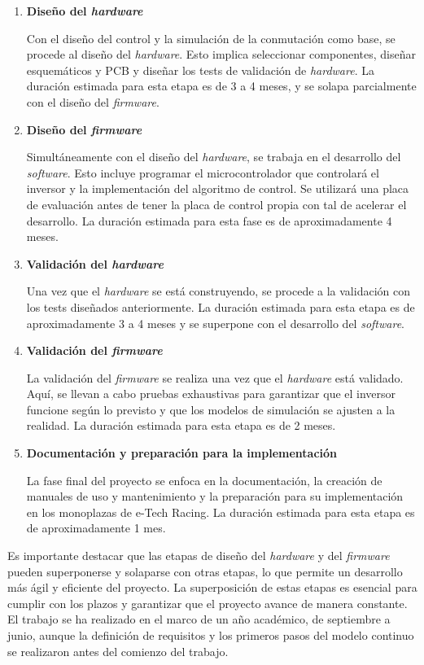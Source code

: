 \begin{enumerate}
\item \textbf{Diseño del \textit{hardware}}

Con el diseño del control y la simulación de la conmutación como base, se procede al diseño del \textit{hardware}. Esto implica seleccionar componentes, diseñar esquemáticos y PCB y diseñar los tests de validación de \textit{hardware}. La duración estimada para esta etapa es de 3 a 4 meses, y se solapa parcialmente con el diseño del \textit{firmware}.

\item \textbf{Diseño del \textit{firmware}}

Simultáneamente con el diseño del \textit{hardware}, se trabaja en el desarrollo del \textit{software}. Esto incluye programar el microcontrolador que controlará el inversor y la implementación del algoritmo de control. Se utilizará una placa de evaluación antes de tener la placa de control propia con tal de acelerar el desarrollo. La duración estimada para esta fase es de aproximadamente 4 meses.

\item \textbf{Validación del \textit{hardware}}

Una vez que el \textit{hardware} se está construyendo, se procede a la validación con los tests diseñados anteriormente. La duración estimada para esta etapa es de aproximadamente 3 a 4 meses y se superpone con el desarrollo del \textit{software}.

\item \textbf{Validación del \textit{firmware}}

La validación del \textit{firmware} se realiza una vez que el \textit{hardware} está validado. Aquí, se llevan a cabo pruebas exhaustivas para garantizar que el inversor funcione según lo previsto y que los modelos de simulación se ajusten a la realidad. La duración estimada para esta etapa es de 2 meses.

\item \textbf{Documentación y preparación para la implementación}

La fase final del proyecto se enfoca en la documentación, la creación de manuales de uso y mantenimiento y la preparación para su implementación en los monoplazas de e-Tech Racing. La duración estimada para esta etapa es de aproximadamente 1 mes. 

\end{enumerate}

Es importante destacar que las etapas de diseño del \textit{hardware} y del \textit{firmware} pueden superponerse y solaparse con otras etapas, lo que permite un desarrollo más ágil y eficiente del proyecto. La superposición de estas etapas es esencial para cumplir con los plazos y garantizar que el proyecto avance de manera constante. El trabajo se ha realizado en el marco de un año académico, de septiembre a junio, aunque la definición de requisitos y los primeros pasos del modelo continuo se realizaron antes del comienzo del trabajo.

